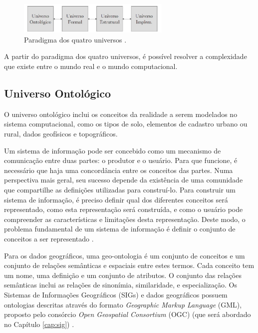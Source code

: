 \begin{figure}[h]
\centering
\includegraphics[width=0.65\textwidth]{./img/cap_II/1-QuatroUniversos}
\caption{Paradigma dos quatro universos \cite{queirozferreira}.}
\label{fig:QuatroUniversos}
\end{figure}

A partir do paradigma dos quatro universos, é possível resolver a complexidade que existe entre o mundo real e o mundo computacional.

\subsection{Universo Ontológico}

O universo ontológico inclui os conceitos da realidade a serem modelados no sistema computacional, como os tipos de solo, elementos de cadastro urbano ou rural, dados geofísicos e topográficos.

Um sistema de informação pode ser concebido como um mecanismo de comunicação entre duas partes: o produtor e o usuário. Para que funcione, é necessário que haja uma concordância entre os conceitos das partes. Numa perspectiva mais geral, seu sucesso depende da existência de uma comunidade que compartilhe as definições utilizadas para construí-lo. Para construir um sistema de informação, é preciso definir qual dos diferentes conceitos será representado, como esta representação será construída, e como o usuário pode compreender as características e limitações desta representação. Deste modo, o problema fundamental de um sistema de informação é definir o conjunto de conceitos a ser representado \cite{queirozferreira}.

Para os dados geográficos, uma geo-ontologia é um conjunto de conceitos e um conjunto de relações semânticas e espaciais entre estes termos. Cada conceito tem um nome, uma definição e um conjunto de atributos. O conjunto das relações semânticas inclui as relações de sinonímia, similaridade, e especialização. Os Sistemas de Informações Geográficos (SIGs) e dados geográficos possuem ontologias descritas através do formato \textit{Geographic Markup Language} (GML), proposto pelo consórcio \textit{Open Geospatial Consortium} (OGC) (que será abordado no Capítulo \ref{cap:sig}) \cite{queirozferreira}.

